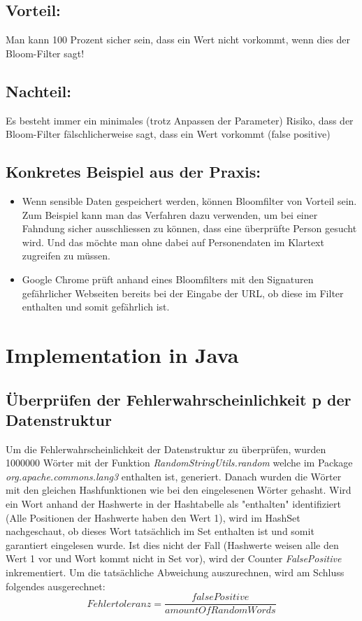 \documentclass[16 pt]{article}
\begin{document}
\subsection{Vorteil:}
Man kann 100 Prozent sicher sein, dass ein Wert nicht vorkommt, wenn dies der Bloom-Filter sagt!
\subsection{Nachteil:}
Es besteht immer ein minimales (trotz Anpassen der Parameter) Risiko, dass der Bloom-Filter fälschlicherweise sagt, dass ein Wert vorkommt (false positive)
\subsection{Konkretes Beispiel aus der Praxis: }
\begin{itemize}
    \item{Wenn sensible Daten gespeichert werden, können Bloomfilter von Vorteil sein. Zum Beispiel kann man das Verfahren dazu verwenden, um bei einer Fahndung sicher ausschliessen zu können, dass eine überprüfte Person gesucht wird. Und das möchte man ohne dabei auf Personendaten im Klartext zugreifen zu müssen.}
    \item{Google Chrome prüft anhand eines Bloomfilters mit den Signaturen gefährlicher Webseiten bereits bei der Eingabe der URL, ob diese im Filter enthalten und somit gefährlich ist.}
\end{itemize}
\pagebreak
\section{Implementation in Java}
\subsection{Überprüfen der Fehlerwahrscheinlichkeit p der Datenstruktur}
Um die Fehlerwahrscheinlichkeit der Datenstruktur zu überprüfen, wurden 1000000 Wörter mit der Funktion \emph{RandomStringUtils.random} welche im Package \emph{org.apache.commons.lang3} enthalten ist, generiert. Danach wurden die Wörter mit den gleichen Hashfunktionen wie bei den eingelesenen Wörter gehasht. Wird ein Wort anhand der Hashwerte in der Hashtabelle  als "enthalten" identifiziert (Alle Positionen der Hashwerte haben den Wert 1), wird im HashSet nachgeschaut, ob dieses Wort tatsächlich im Set enthalten ist und somit garantiert eingelesen wurde. Ist dies nicht der Fall (Hashwerte weisen alle den Wert 1 vor und Wort kommt nicht in Set vor), wird der Counter \emph{FalsePositive} inkrementiert.
Um die tatsächliche Abweichung auszurechnen, wird am Schluss folgendes ausgerechnet:
\[
    \boxed{Fehlertoleranz = \frac{falsePositive}{amountOfRandomWords}}
    \] \\
\end{document}
